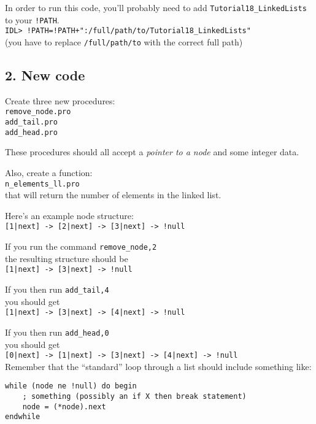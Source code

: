 \documentclass{article}
\begin{document}
\begin{spacing}{1.0}
In order to run this code, you'll probably need to add
\verb|Tutorial18_LinkedLists| to your \verb|!PATH|.\\
\verb|IDL> !PATH=!PATH+":/full/path/to/Tutorial18_LinkedLists"|\\
(you have to replace \verb|/full/path/to| with the correct full path) \\


\subsection{2. New code} 

Create three new procedures:\\
\verb|remove_node.pro|\\
\verb|add_tail.pro|\\
\verb|add_head.pro|

These procedures should all accept a \emph{pointer to a node} and some integer data.

Also, create a function: \\
\verb|n_elements_ll.pro|\\
that will return the number of elements in the linked list.

Here's an example node structure:\\
\verb?[1|next] -> [2|next] -> [3|next] -> !null?

If you run the command 
\verb|remove_node,2|\\ 
the resulting structure should be\\
\verb?[1|next] -> [3|next] -> !null?

If you then run 
\verb|add_tail,4|\\
you should get \\
\verb?[1|next] -> [3|next] -> [4|next] -> !null?

If you then run 
\verb|add_head,0|\\
you should get \\
\verb?[0|next] -> [1|next] -> [3|next] -> [4|next] -> !null?\\

Remember that the “standard” loop through a list should include something like:
\begin{lstlisting}
while (node ne !null) do begin
    ; something (possibly an if X then break statement)
    node = (*node).next
endwhile
\end{lstlisting}

\end{spacing}
\end{document}
